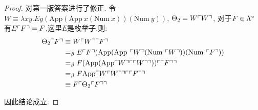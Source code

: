 \begin{proof}
{\color {red} {对第一版答案进行了修正.}}    
    令$W \equiv \lambda xy.Ey(\text{App} (\text{App} \ x(\text{Num} \ x))(\text{Num} \ y))$, $\Theta_2=W \ulcorner{W}\urcorner$, 对于$F\in \Lambda^\circ$有$E\ulcorner{F}\urcorner=F$,这里$E$是枚举子.则:
    \begin{align*}
        \Theta_2 \churchnumber{F} &\equiv W \churchnumber{W}\churchnumber{F}\\
        &\equivbeta E\churchnumber{F}(\text{App} (\text{App} \ \churchnumber{W}(\text{Num} \ \churchnumber{W}))(\text{Num} \ \churchnumber{F}))\\
        &\equivbeta F(\text{App}(\text{App} \churchnumber{W} \churchnumber{\churchnumber{W}}))\churchnumber{\churchnumber{F}} \\
        &\equivbeta F \text{App} \churchnumber{W \churchnumber{W}} \churchnumber{\churchnumber{F}}\\
        &\equiv F\churchnumber{\Theta_2\churchnumber{F}}
    \end{align*}

    因此结论成立.
\end{proof}